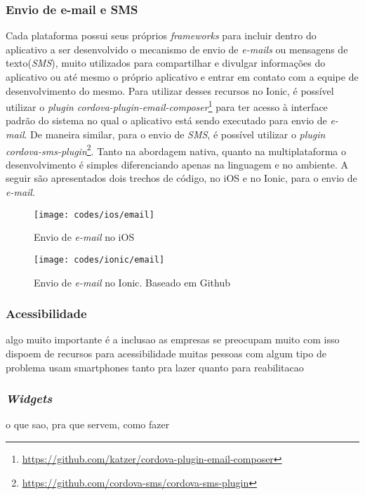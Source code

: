 \subsubsection{Envio de e-mail e SMS} \label{subsubsec:emailsms}
Cada plataforma possui seus próprios \textit{frameworks} para incluir dentro do aplicativo a ser desenvolvido o mecanismo de envio de \textit{e-mails} ou mensagens de texto(\textit{SMS}), muito utilizados para compartilhar 
e divulgar informações do aplicativo ou até mesmo o próprio aplicativo e entrar em contato com a equipe de desenvolvimento do mesmo. Para utilizar desses recursos no Ionic, é possível utilizar o 
\textit{plugin cordova-plugin-email-composer}\footnote{\url{https://github.com/katzer/cordova-plugin-email-composer}} para ter acesso à interface padrão do sistema no qual o aplicativo está sendo executado para envio de 
\textit{e-mail}. De maneira similar, para o envio de \textit{SMS}, é possível utilizar o \textit{plugin cordova-sms-plugin}\footnote{\url{https://github.com/cordova-sms/cordova-sms-plugin}}. Tanto na abordagem nativa, 
quanto na multiplataforma o desenvolvimento é simples diferenciando apenas na linguagem e no ambiente. A seguir são apresentados dois trechos de código, no iOS e no Ionic, para o envio de \textit{e-mail}.
\begin{figure}[H]
	\centering
	\texttt{[image: codes/ios/email]}
	\caption[Envio de \textit{e-mail} no iOS]{Envio de \textit{e-mail} no iOS}
	\label{fig:email-ios}
\end{figure}
\begin{figure}[H]
	\centering
	\texttt{[image: codes/ionic/email]}
	\caption[Envio de \textit{e-mail} no Ionic]{Envio de \textit{e-mail} no Ionic. Baseado em Github\protect\footnotemark}
	\label{fig:email-ionic}
\end{figure}

\subsubsection{Acessibilidade} \label{subsubsec:acessibilidade}
algo muito importante é a inclusao
as empresas se preocupam muito com isso
dispoem de recursos para acessibilidade
muitas pessoas com algum tipo de problema usam smartphones tanto pra lazer quanto para reabilitacao

\subsubsection{\textit{Widgets}} \label{subsubsec:widgets}
o que sao, pra que servem, como fazer

